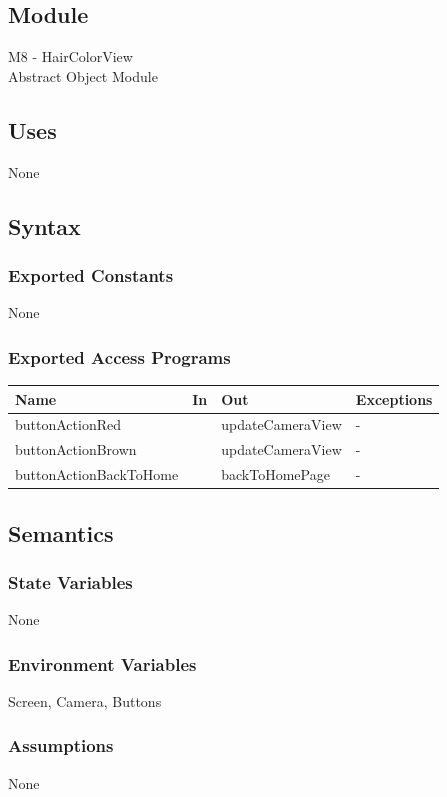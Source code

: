 \documentclass[12pt, titlepage]{article}
\begin{document}
\subsection{Module}
M8 - HairColorView\\
Abstract Object Module

\subsection{Uses}
None

\subsection{Syntax}
\subsubsection{Exported Constants}
None

\subsubsection{Exported Access Programs}
\begin{center}
\begin{tabular}{p{4cm} p{3cm} p{4cm} p{4cm}}
\hline
\textbf{Name} & \textbf{In} & \textbf{Out} & \textbf{Exceptions} \\
\hline
buttonActionRed &  & updateCameraView & - \\
buttonActionBrown &  & updateCameraView & - \\
buttonActionBackToHome &  & backToHomePage & - \\
\hline
\end{tabular}
\end{center}

\subsection{Semantics}

\subsubsection{State Variables}
None

\subsubsection{Environment Variables}
Screen, Camera, Buttons

\subsubsection{Assumptions}
None
\end{document}
